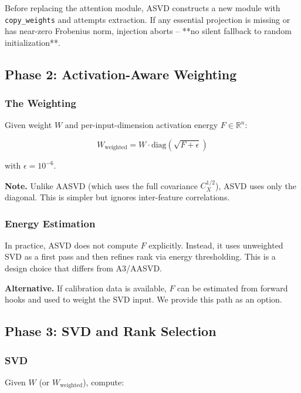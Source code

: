 Before replacing the attention module, ASVD constructs a new module with 
\texttt{copy\_weights} and attempts extraction. If any essential projection is 
missing or has near-zero Frobenius norm, injection aborts -- **no silent 
fallback to random initialization**.

\subsection{Phase 2: Activation-Aware Weighting}

\subsubsection{The Weighting}

Given weight $W$ and per-input-dimension activation energy $F \in \mathbb{R}^n$:

\begin{equation}
W_\text{weighted} = W \cdot \text{diag}(\sqrt{F + \epsilon})
\end{equation}

with $\epsilon = 10^{-6}$.

\textbf{Note.} Unlike AASVD (which uses the full covariance $C_X^{1/2}$), ASVD 
uses only the diagonal. This is simpler but ignores inter-feature 
correlations.

\subsubsection{Energy Estimation}

In practice, ASVD does not compute $F$ explicitly. Instead, it uses 
unweighted SVD as a first pass and then refines rank via energy 
thresholding. This is a design choice that differs from A3/AASVD.

\textbf{Alternative.} If calibration data is available, $F$ can be estimated 
from forward hooks and used to weight the SVD input. We provide this path 
as an option.

\subsection{Phase 3: SVD and Rank Selection}

\subsubsection{SVD}

Given $W$ (or $W_\text{weighted}$), compute:


